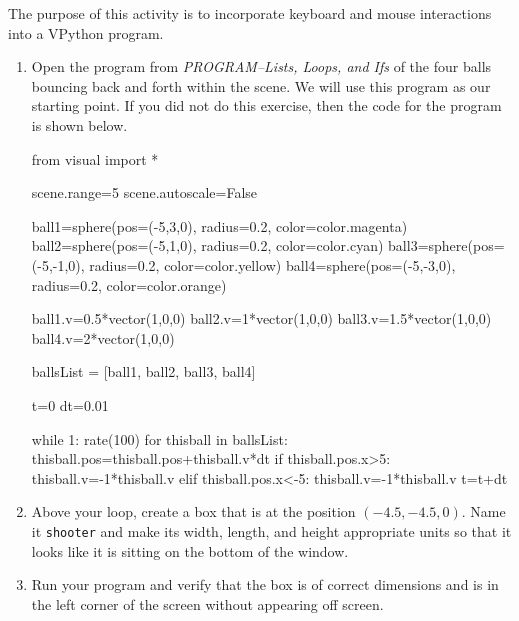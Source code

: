 
\apparatus
{}

\longgoal

The purpose of this activity is to incorporate keyboard and mouse interactions into a VPython program.

\procedure

\begin{enumerate}

	\subsection*{Using the keyboard to set the velocity of an object}

	\item Open the program from \emph{PROGRAM--Lists, Loops, and Ifs} of the four balls bouncing back and forth within the scene. We will use this program as our starting point. If you did not do this exercise, then the code for the program is shown below.
	
\begin{myvpython}
from visual import *

scene.range=5
scene.autoscale=False

ball1=sphere(pos=(-5,3,0), radius=0.2, color=color.magenta)
ball2=sphere(pos=(-5,1,0), radius=0.2, color=color.cyan)
ball3=sphere(pos=(-5,-1,0), radius=0.2, color=color.yellow)
ball4=sphere(pos=(-5,-3,0), radius=0.2, color=color.orange)

ball1.v=0.5*vector(1,0,0)
ball2.v=1*vector(1,0,0)
ball3.v=1.5*vector(1,0,0)
ball4.v=2*vector(1,0,0)

ballsList = [ball1, ball2, ball3, ball4]

t=0
dt=0.01

while 1:
    rate(100)
    for thisball in ballsList:
        thisball.pos=thisball.pos+thisball.v*dt
        if thisball.pos.x>5:
            thisball.v=-1*thisball.v
        elif thisball.pos.x<-5:
            thisball.v=-1*thisball.v
    t=t+dt
\end{myvpython}

	\item Above your  loop, create a box that is at the position $(-4.5, -4.5, 0)$. Name it \texttt{shooter} and make its width, length, and height appropriate units so that it looks like it is sitting on the bottom of the window.
	
	\item Run your program and verify that the box is of correct dimensions and is in the left corner of the screen without appearing off screen.
	

\end{enumerate}
